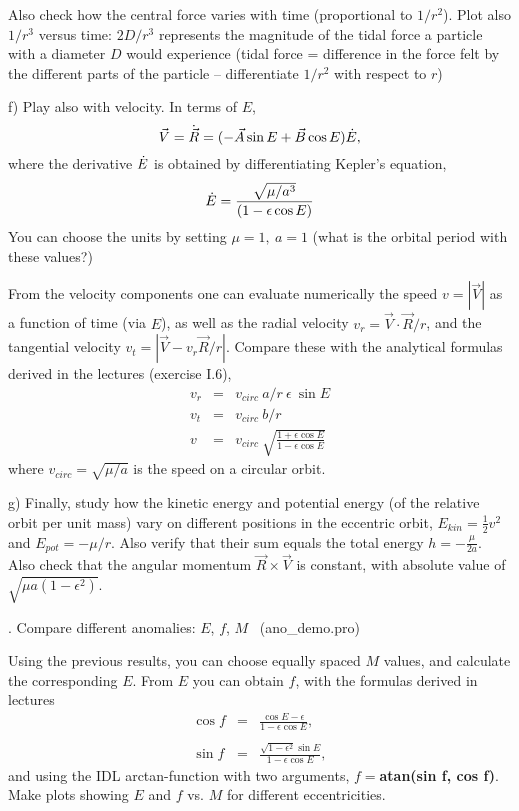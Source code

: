 \documentclass[a4paper,12pt]{article}
\def\p{\mathaccent 95 }
\begin{document}
{{Also check how the central force varies with time (proportional to
$1/r^2$).  Plot also $1/r^3$ versus time: $2D/r^3$ represents the
magnitude of the tidal force a particle with a diameter $D$ would
experience (tidal force = difference in the force felt by the
different parts of the particle -- differentiate $1/r^2$ with respect to $r$)

f) Play also with velocity. In terms of $E$,
\begin{equation}
\vec V =\p {\vec R} = (- \vec A \sin E + \vec B \cos E) \p E,
\label{eq_vec_v}
\end{equation}
\noindent where the derivative $\p E$ is obtained by differentiating Kepler's
equation,
\begin{equation}
\p E = \frac{\sqrt{\mu/a^3}}{(1-\epsilon \cos E)}
\label{eq_ep}
\end{equation}
\noindent You can choose the units by setting $\mu=1,\  a=1$
(what is the orbital period with these values?)

From the velocity components one can evaluate numerically
the speed $v= |\vec V|$ as a function of time (via $E$), as well as
the  radial velocity $v_r= \vec V \cdot \vec R/r$, and the
tangential velocity $v_t=|\vec V - v_r \vec R/r|$.
Compare these with the analytical formulas derived in the lectures (exercise I.6),
\begin{eqnarray}
v_r &=& v_{circ} \ a/r \ \epsilon \ \sin E \\ \nonumber
v_t &=& v_{circ} \ b/r \\ \nonumber
v   &=& v_{circ} \ \sqrt{\frac{1+\epsilon \cos E}{1-\epsilon \cos E}}
\label{eq_vr}
\end{eqnarray}
\noindent where $v_{circ}= \sqrt{\mu/a}$ is the speed on a circular orbit.

g) Finally, study how the kinetic energy and potential energy (of the
relative orbit per unit mass) vary on different positions in the eccentric orbit, $E_{kin}=\frac{1}{2}v^2$ and $E_{pot}=-\mu/r$. Also verify that their sum equals the total energy
$h=-\frac{\mu}{2a}$.
Also check that the angular momentum $\vec R \times \vec V$ is constant, with
absolute value of $\sqrt{\mu a(1-\epsilon^2)}$.
}

\newpage

{. Compare different anomalies: $E$, $f$, $M$} \ (ano\_demo.pro)

Using the previous results, you can choose equally spaced $M$ values,
and calculate the corresponding $E$. From $E$ you can obtain $f$,
with the formulas derived in lectures
\begin{eqnarray}
\cos f &=& \frac{\cos E - \epsilon}{1-\epsilon \cos E}, \\ \\ \nonumber
\sin f &=& \frac{\sqrt{1-\epsilon^2} \sin E}{1-\epsilon \cos E},
\end{eqnarray}
\noindent and using the IDL arctan-function with two arguments,
$f=${\bf atan(sin f, cos f)}.
Make plots showing $E$ and $f$ vs. $M$ for different eccentricities.

}
\end{document}
